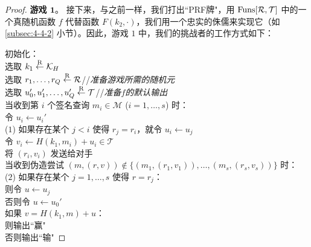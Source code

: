 \begin{proof}
\noindent\textbf{游戏 $\mathbf{1}$}。
接下来，与之前一样，我们打出``PRF牌"，用 ${\rm Funs}[\mathcal{R},\mathcal{T}]$ 中的一个真随机函数 $f$ 代替函数 $F(k_2,\cdot)$，我们用一个忠实的侏儒来实现它（如 \ref{subsec:4-4-2} 小节）。因此，游戏 $1$ 中，我们的挑战者的工作方式如下：

\vspace{5pt}

\hspace*{5pt} 初始化：\\
\hspace*{50pt} 选取 $k_1\overset{\rm R}\leftarrow\mathcal{K}_H$\\
\hspace*{50pt} 选取 $r_1,\dots,r_Q\overset{\rm R}\leftarrow\mathcal{R}$\quad//\quad\emph{准备游戏所需的随机元}\\
\hspace*{50pt} 选取 $u_0',u_1',\dots,u_Q'\overset{\rm R}\leftarrow\mathcal{T}$\quad//\quad\emph{准备$f$的默认输出}\\
\hspace*{26pt} 当收到第 $i$ 个签名查询 $m_i\in\mathcal{M}$ ($i=1,\dots,s$) 时：\\
\hspace*{50pt} 令 $u_i\leftarrow u_i'$\\
\hspace*{1pt} ($1$)
\hspace*{28.5pt} 如果存在某个 $j<i$ 使得 $r_j=r_i$，就令 $u_i\leftarrow u_j$\\
\hspace*{50pt} 令 $v_i\leftarrow H(k_1,m_i)+u_i\in\mathcal{T}$\\
\hspace*{50pt} 将 $(r_i,v_i)$ 发送给对手\\
\hspace*{26pt} 当收到伪造尝试 $(m,(r,v))\notin\{(m_1,(r_1,v_1)),\dots,(m_s,(r_s,v_s))\}$ 时：\\
\hspace*{1pt} ($2$)
\hspace*{28.5pt} 如果存在某个 $j=1,\dots,s$ 使得 $r=r_j$：\\
\hspace*{75pt} 则令 $u\leftarrow u_j$\\
\hspace*{75pt} 否则令 $u\leftarrow u_0'$\\
\hspace*{50pt} 如果 $v=H(k_1,m)+u$：\\
\hspace*{75pt} 则输出``赢"\\
\hspace*{75pt} 否则输出``输"


\end{proof}
